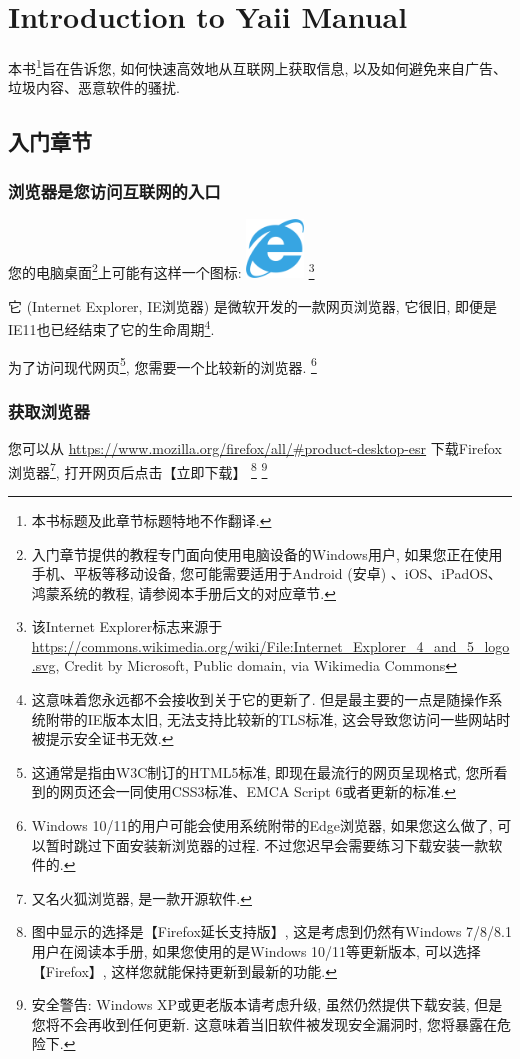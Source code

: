 \chapter{Introduction to Yaii Manual}

本书\footnote{本书标题及此章节标题特地不作翻译. }旨在告诉您, 如何快速高效地从互联网上获取信息, 以及如何避免来自广告、垃圾内容、恶意软件的骚扰. 

\section{入门章节}

\subsection{浏览器是您访问互联网的入口}

您的电脑桌面\footnote{入门章节提供的教程专门面向使用电脑设备的Windows用户, 如果您正在使用手机、平板等移动设备, 您可能需要适用于Android (安卓) 、iOS、iPadOS、鸿蒙系统的教程, 请参阅本手册后文的对应章节. }上可能有这样一个图标: 
\includegraphics[width=0.6in]{media/Internet_Explorer_4_and_5_logo.png}
\footnote{该Internet Explorer标志来源于 \url{https://commons.wikimedia.org/wiki/File:Internet_Explorer_4_and_5_logo.svg}, Credit by Microsoft, Public domain, via Wikimedia Commons}

它 (Internet
Explorer, IE浏览器) 是微软开发的一款网页浏览器, 它很旧, 即便是IE11也已经结束了它的生命周期\footnote{这意味着您永远都不会接收到关于它的更新了. 但是最主要的一点是随操作系统附带的IE版本太旧, 无法支持比较新的TLS标准, 这会导致您访问一些网站时被提示安全证书无效. }. 

为了访问现代网页\footnote{这通常是指由W3C制订的HTML5标准, 即现在最流行的网页呈现格式, 您所看到的网页还会一同使用CSS3标准、EMCA Script 6或者更新的标准. }, 您需要一个比较新的浏览器. \footnote{Windows 10/11的用户可能会使用系统附带的Edge浏览器, 如果您这么做了, 可以暂时跳过下面安装新浏览器的过程. 不过您迟早会需要练习下载安装一款软件的. }

\subsection{获取浏览器}

您可以从 \url{https://www.mozilla.org/firefox/all/\#product-desktop-esr} 下载Firefox浏览器\footnote{又名火狐浏览器, 是一款开源软件. }, 打开网页后点击【立即下载】
\footnote{图中显示的选择是【Firefox延长支持版】, 这是考虑到仍然有Windows
7/8/8.1用户在阅读本手册, 如果您使用的是Windows
10/11等更新版本, 可以选择【Firefox】, 这样您就能保持更新到最新的功能. }
\footnote{安全警告: Windows XP或更老版本请考虑升级, 虽然仍然提供下载安装, 但是您将不会再收到任何更新. 这意味着当旧软件被发现安全漏洞时, 您将暴露在危险下. }

